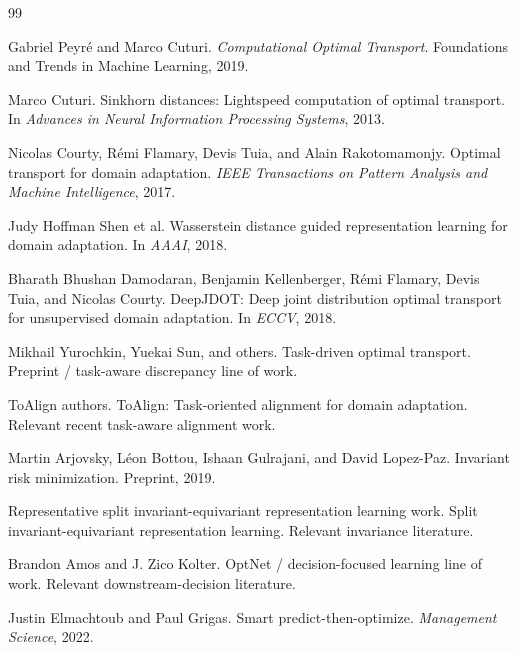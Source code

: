 \documentclass[10pt,twocolumn]{article}
\begin{document}
\begin{thebibliography}{99}

Gabriel Peyr\'e and Marco Cuturi.
\newblock \emph{Computational Optimal Transport}.
\newblock Foundations and Trends in Machine Learning, 2019.

Marco Cuturi.
\newblock Sinkhorn distances: Lightspeed computation of optimal transport.
\newblock In \emph{Advances in Neural Information Processing Systems}, 2013.

Nicolas Courty, R\'emi Flamary, Devis Tuia, and Alain Rakotomamonjy.
\newblock Optimal transport for domain adaptation.
\newblock \emph{IEEE Transactions on Pattern Analysis and Machine Intelligence}, 2017.

Judy Hoffman Shen et al.
\newblock Wasserstein distance guided representation learning for domain adaptation.
\newblock In \emph{AAAI}, 2018.

Bharath Bhushan Damodaran, Benjamin Kellenberger, R\'emi Flamary, Devis Tuia, and Nicolas Courty.
\newblock DeepJDOT: Deep joint distribution optimal transport for unsupervised domain adaptation.
\newblock In \emph{ECCV}, 2018.

Mikhail Yurochkin, Yuekai Sun, and others.
\newblock Task-driven optimal transport.
\newblock Preprint / task-aware discrepancy line of work.

ToAlign authors.
\newblock ToAlign: Task-oriented alignment for domain adaptation.
\newblock Relevant recent task-aware alignment work.

Martin Arjovsky, L\'eon Bottou, Ishaan Gulrajani, and David Lopez-Paz.
\newblock Invariant risk minimization.
\newblock Preprint, 2019.

Representative split invariant-equivariant representation learning work.
\newblock Split invariant-equivariant representation learning.
\newblock Relevant invariance literature.

Brandon Amos and J. Zico Kolter.
\newblock OptNet / decision-focused learning line of work.
\newblock Relevant downstream-decision literature.

Justin Elmachtoub and Paul Grigas.
\newblock Smart predict-then-optimize.
\newblock \emph{Management Science}, 2022.

\end{thebibliography}
\end{document}
